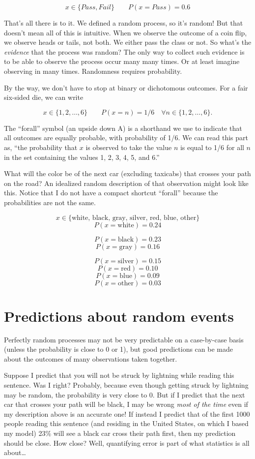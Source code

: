\documentclass[
  openany]{book}
\begin{document}
\[ x \in \{Pass, Fail\} \qquad P(x=Pass) = 0.6\]

That's all there is to it. We defined a random process, so it's random! But that doesn't mean all of this is intuitive. When we observe the outcome of a coin flip, we observe heads or tails, not both. We either pass the class or not. So what's the \emph{evidence} that the process was random? The only way to collect such evidence is to be able to observe the process occur many many times. Or at least imagine observing in many times. Randomness requires probability.

By the way, we don't have to stop at binary or dichotomous outcomes. For a fair six-sided die, we can write

\[ x \in \{1, 2, \dots, 6\} \qquad P(x=n) = 1/6 \quad \forall n \in \{1, 2, \dots, 6\}. \]

The ``forall'' symbol (an upside down A) is a shorthand we use to indicate that all outcomes are equally probable, with probability of 1/6. We can read this part as, ``the probability that \(x\) is observed to take the value \(n\) is equal to 1/6 for all \(n\) in the set containing the values 1, 2, 3, 4, 5, and 6.''

What will the color be of the next car (excluding taxicabs) that crosses your path on the road? An idealized random description of that observation might look like this. Notice that I do not have a compact shortcut ``forall'' because the probabilities are not the same.

\[ x \in \{\mbox{white, black, gray, silver, red, blue, other}\} \]
\[ P(x=\mbox{white}) = 0.24 \]

\[ P(x=\mbox{black}) = 0.23 \]
\[P(x=\mbox{gray}) = 0.16 \]

\[P(x=\mbox{silver}) = 0.15 \]
\[P(x=\mbox{red}) = 0.10 \]
\[P(x=\mbox{blue}) = 0.09 \]
\[P(x=\mbox{other}) = 0.03 \]

\hypertarget{predictions-about-random-events}{%
\section{Predictions about random events}\label{predictions-about-random-events}}

Perfectly random processes may not be very predictable on a case-by-case basis (unless the probability is close to 0 or 1), but good predictions can be made about the outcomes of many observations taken together.

Suppose I predict that you will not be struck by lightning while reading this sentence. Was I right? Probably, because even though getting struck by lightning may be random, the probability is very close to 0. But if I predict that the next car that crosses your path will be black, I may be wrong \emph{most of the time} even if my description above is an accurate one! If instead I predict that of the first 1000 people reading this sentence (and residing in the United States, on which I based my model) 23\% will see a black car cross their path first, then my prediction should be close. How close? Well, quantifying error is part of what statistics is all about\ldots{}
\end{document}
